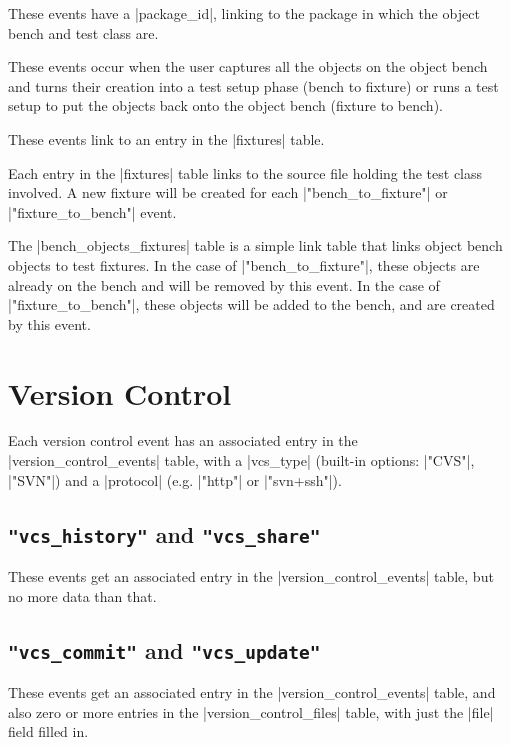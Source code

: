 \documentclass{report}
\begin{document}
These events have a |package_id|, linking to the package in which the object bench
and test class are.

These events occur when the user captures all the objects on the object bench
and turns their creation into a test setup phase (bench to fixture) or runs a
test setup to put the objects back onto the object bench (fixture to bench).

These events link to an entry in the |fixtures| table.


Each entry in the |fixtures| table links to the source file holding the test
class involved.  A new fixture will be created for each |"bench_to_fixture"|
or |"fixture_to_bench"| event.


The |bench_objects_fixtures| table is a simple link table that links object
bench objects to test fixtures.  In the case of |"bench_to_fixture"|, these
objects are already on the bench and will be removed by this event.  In the
case of |"fixture_to_bench"|, these objects will be added to the bench, and
are created by this event.

\section{Version Control}



Each version control event has an associated entry in the
|version_control_events| table, with a |vcs_type| (built-in options:
|"CVS"|, |"SVN"|) and a |protocol| (e.g. |"http"| or |"svn+ssh"|).

\subsection{\lstinline!"vcs_history"! and \lstinline!"vcs_share"!}

These events get an associated entry in the |version_control_events|
table, but no more data than that.

\subsection{\lstinline!"vcs_commit"! and \lstinline!"vcs_update"!}

These events get an associated entry in the |version_control_events|
table, and also zero or more entries in the |version_control_files|
table, with just the |file| field filled in.
\end{document}
